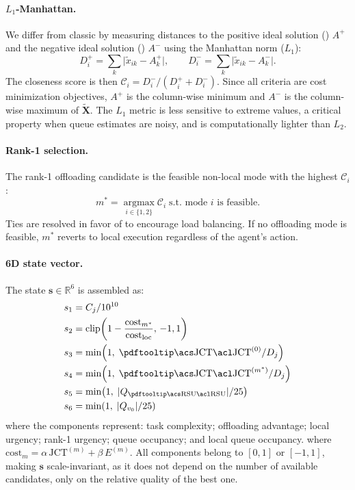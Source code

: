 \paragraph{ $L_1$-Manhattan.}
We differ from classic  by measuring distances to the positive ideal solution ()
$A^+$ and the negative ideal solution () $A^-$ using the Manhattan norm
($L_1$):
\begin{equation}
  D_i^+ = \textstyle\sum_{k} \lvert \widetilde{x}_{ik} - A_k^+ \rvert,
  \qquad
  D_i^- = \textstyle\sum_{k} \lvert \widetilde{x}_{ik} - A_k^- \rvert.
  \label{eq:manhattan}
\end{equation}
The closeness score is then $\mathcal{C}_i = D_i^- / (D_i^+ + D_i^-)$.
Since all criteria are cost minimization objectives, $A^+$ is the
column-wise minimum and $A^-$ is the column-wise maximum of
$\widetilde{\mathbf{X}}$.
The $L_1$ metric is less sensitive to extreme values, a critical property when
queue estimates are noisy, and is computationally lighter than $L_2$.

\paragraph{Rank-1 selection.}
The rank-1 offloading candidate is the feasible non-local mode with the
highest $\mathcal{C}_i$:
\begin{equation}
  m^* = \operatorname*{argmax}_{i \in \{1,2\}} \mathcal{C}_i
        \;\text{s.t.\ mode } i \text{ is feasible}.
  \label{eq:rank1}
\end{equation}
Ties are resolved in favor of  to encourage load balancing.
If no offloading mode is feasible, $m^*$ reverts to local execution
regardless of the agent's action.

\paragraph{6D state vector.}
The state $\mathbf{s} \in \mathbb{R}^6$ is assembled as:
\begin{align}
  s_1 &= C_j / 10^{10} \notag \\
  s_2 &= \mathrm{clip}\!\left(1 - \frac{\mathrm{cost}_{m^*}}{\mathrm{cost}_{\mathrm{loc}}},\,-1,1\right) \notag \\
  s_3 &= \min\!\left(1,\; \mathrm{\acrotip{JCT}}^{(0)} / D_j\right) \notag \\
  s_4 &= \min\!\left(1,\; \mathrm{\acrotip{JCT}}^{(m^*)} / D_j\right) \notag \\
  s_5 &= \min\!\left(1,\; |Q_{\mathrm{\acrotip{RSU}}}| / 25\right) \notag \\
  s_6 &= \min\!\left(1,\; |Q_{v_0}| / 25\right)
  \label{eq:state}
\end{align}
{\scriptsize where the components represent: task complexity; offloading advantage; local urgency; rank-1 urgency;  queue occupancy; and local queue occupancy.}
where $\mathrm{cost}_m = \alpha\,\mathrm{JCT}^{(m)} + \beta\,E^{(m)}$.
All components belong to $[0,1]$ or $[-1,1]$, making $\mathbf{s}$
scale-invariant, as it does not depend on the number of available candidates,
only on the relative quality of the best one.


